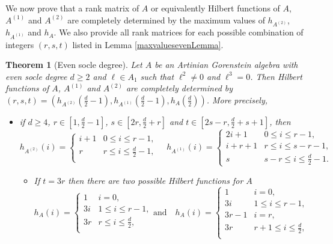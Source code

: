 \documentclass[12pt]{amsart}
\numberwithin{equation}{section}
\theoremstyle{plain} \newtheorem{theorem}{Theorem}[section]
\theoremstyle{definition} \newtheorem{definition}[theorem]{Definition}
\begin{document}
We now prove that a rank matrix of $A$ or equivalently  Hilbert functions of $A$, $A^{(1)}$ and $A^{(2)}$  are  completely determined by the maximum values of  $h_{A^{(2)}}$, $h_{A^{(1)}}$ and $h_{A}$. We also provide all rank matrices for each possible combination of integers  $(r,s,t)$ listed in Lemma \ref{maxvaluesevenLemma}. 
\begin{theorem}[Even socle degree]\label{3linesHFtheorem-even}
Let $A$ be an Artinian Gorenstein algebra with even socle degree $d\geq 2$ and $\ell\in A_1$ such that $\ell^2\neq 0$ and  $\ell^3=0$. Then Hilbert functions of $A$, $A^{(1)}$ and $A^{(2)}$  are  completely determined by $(r,s,t)=(h_{A^{(2)}}(\frac{d}{2}-1) ,h_{A^{(1)}}(\frac{d}{2}-1),h_A(\frac{d}{2}))$. More precisely, 
\begin{itemize}
\item[$(1)$] if $d\geq 4$, $r\in [1,\frac{d}{2}-1]$, $s\in[2r,\frac{d}{2}+r]$ and $t\in [2s-r,\frac{d}{2}+s+1]$, then  
\begin{equation}\label{HFeven(1)}
h_{A^{(2)}}(i)=\left\{
                \begin{array}{ll}
                  i+1 &  0\leq i\leq r-1,\\
                  r & r\leq i\leq \frac{d}{2}-1,\\
                \end{array}
              \right.\quad
h_{A^{(1)}}(i)=\left\{
                \begin{array}{ll}
                  2i+1 &  0\leq i\leq r-1,\\
                  i+r+1 & r\leq i\leq s-r-1,\\
                  s & s-r\leq i\leq \frac{d}{2}-1.
                \end{array}
              \right.
 \end{equation}
  \begin{itemize}
\item If $t=3r$ then there are two possible Hilbert functions for $A$
\begin{equation}\label{HFevenA(1,1)}
h_{A}(i)=\left\{
                \begin{array}{ll}
                 1 & i=0,\\
                  3i &  1\leq i\leq r-1,\\
                  3r & r\leq i\leq\frac{d}{2},\\
                \end{array}
              \right.
\text{and} \quad 
h_{A}(i)=\left\{
                \begin{array}{ll}
                   1 & i=0,\\
                  3i &  1\leq i\leq r-1,\\
                  3r-1& i=r,\\
                  3r & r+1\leq i\leq \frac{d}{2},\\
                \end{array}
              \right.
 \end{equation}


\end{itemize}
\end{itemize}
\end{theorem}
\end{document}
